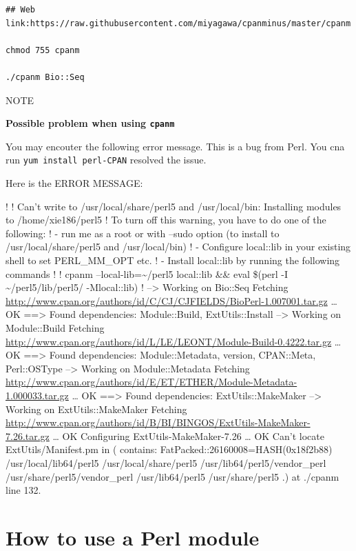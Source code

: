 \documentclass[]{book}
\let\BeginKnitrBlock\begin \let\EndKnitrBlock\end
\begin{document}
\begin{verbatim}
## Web link:https://raw.githubusercontent.com/miyagawa/cpanminus/master/cpanm

chmod 755 cpanm

./cpanm Bio::Seq
\end{verbatim}

NOTE

\BeginKnitrBlock{rmdtip}
\textbf{Possible problem when using \texttt{cpanm}}

You may encouter the following error message. This is a bug from Perl. You cna run \texttt{yum\ install\ perl-CPAN} resolved the issue.

Here is the ERROR MESSAGE:

!
! Can't write to /usr/local/share/perl5 and /usr/local/bin: Installing modules to /home/xie186/perl5
! To turn off this warning, you have to do one of the following:
! - run me as a root or with --sudo option (to install to /usr/local/share/perl5 and /usr/local/bin)
! - Configure local::lib in your existing shell to set PERL\_MM\_OPT etc.
! - Install local::lib by running the following commands
!
! cpanm --local-lib=\textasciitilde{}/perl5 local::lib \&\& eval \$(perl -I \textasciitilde{}/perl5/lib/perl5/ -Mlocal::lib)
!
--\textgreater{} Working on Bio::Seq
Fetching \url{http://www.cpan.org/authors/id/C/CJ/CJFIELDS/BioPerl-1.007001.tar.gz} \ldots{} OK
==\textgreater{} Found dependencies: Module::Build, ExtUtils::Install
--\textgreater{} Working on Module::Build
Fetching \url{http://www.cpan.org/authors/id/L/LE/LEONT/Module-Build-0.4222.tar.gz} \ldots{} OK
==\textgreater{} Found dependencies: Module::Metadata, version, CPAN::Meta, Perl::OSType
--\textgreater{} Working on Module::Metadata
Fetching \url{http://www.cpan.org/authors/id/E/ET/ETHER/Module-Metadata-1.000033.tar.gz} \ldots{} OK
==\textgreater{} Found dependencies: ExtUtils::MakeMaker
--\textgreater{} Working on ExtUtils::MakeMaker
Fetching \url{http://www.cpan.org/authors/id/B/BI/BINGOS/ExtUtils-MakeMaker-7.26.tar.gz} \ldots{} OK
Configuring ExtUtils-MakeMaker-7.26 \ldots{} OK
Can't locate ExtUtils/Manifest.pm in \citet{INC} (\citet{INC} contains: FatPacked::26160008=HASH(0x18f2b88) /usr/local/lib64/perl5 /usr/local/share/perl5 /usr/lib64/perl5/vendor\_perl /usr/share/perl5/vendor\_perl /usr/lib64/perl5 /usr/share/perl5 .) at ./cpanm line 132.
\EndKnitrBlock{rmdtip}

\hypertarget{how-to-use-a-perl-module}{%
\section{How to use a Perl module}\label{how-to-use-a-perl-module}}
\end{document}
